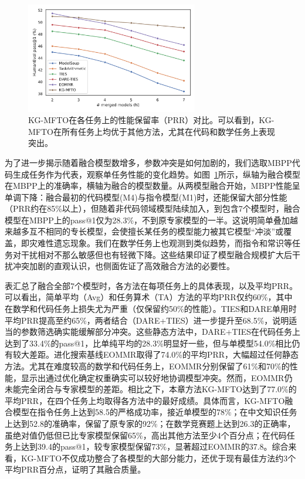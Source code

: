 \documentclass[../main.tex]{subfiles}
\begin{document}
\begin{figure}
	\centering
	\includegraphics[width=0.67\textwidth]{KG-MFTO/figure2_single_task_coding.pdf}
	\caption{KG-MFTO在各任务上的性能保留率（PRR）对比。可以看到，KG-MFTO在所有任务上均优于其他方法，尤其在代码和数学任务上表现突出。}
	\label{fig:task-wise-prr}
\end{figure}

为了进一步揭示随着融合模型数增多，参数冲突是如何加剧的，我们选取MBPP代码生成任务作为代表，观察单任务性能的变化趋势。如图~\ref{fig:task-wise-prr}所示，纵轴为融合模型在MBPP上的准确率，横轴为融合的模型数量。从两模型融合开始，MBPP性能呈单调下降：融合最初的代码模型(M4)与指令模型(M1)时，还能保留大部分性能（PRR约在85\%以上），但随着非代码领域模型陆续加入，到包含7个模型时，融合模型在MBPP上的pass@1仅为28.3\%，不到原专家模型的一半。这说明简单叠加越来越多互不相同的专长模型，会使擅长某任务的模型能力被其它模型“冲淡”或覆盖，即灾难性遗忘现象。我们在数学任务上也观测到类似趋势，而指令和常识等任务对干扰相对不那么敏感但也有轻微下降。这些结果印证了模型融合规模扩大后干扰冲突加剧的直观认识，也侧面佐证了高效融合方法的必要性。

表汇总了融合全部7个模型时，各方法在每项任务上的具体表现，以及平均PRR。可以看出，简单平均（Avg）和任务算术（TA）方法的平均PRR仅约60\%，其中在数学和代码任务上损失尤为严重（仅保留约50\%的性能）。TIES和DARE单用时平均PRR提高至约65\%，两者结合（DARE+TIES）进一步提升至68.5\%，说明适当的参数筛选确实能缓解部分冲突。这些静态方法中，DARE+TIES在代码任务上达到了33.4\%的pass@1，比单纯平均的28.3\%明显好一些，但与单模型54.0\%相比仍有较大差距。进化搜索基线EOMMR取得了74.0\%的平均PRR，大幅超过任何静态方法。尤其在难度较高的数学和代码任务上，EOMMR分别保留了61\%和70\%的性能，显示出通过优化确定权重确实可以较好地协调模型冲突。然而，EOMMR仍未能完全闭合与专家模型的差距。相比之下，本章方法KG-MFTO达到了77.0\%的平均PRR，在四个任务上均取得各方法中的最好成绩。具体而言，KG-MFTO融合模型在指令任务上达到58.5的严格成功率，接近单模型的78\%；在中文知识任务上达到52.8的准确率，保留了原专家的92\%；在数学竞赛题上达到26.3的正确率，虽绝对值仍低但已比专家模型保留65\%，高出其他方法至少4个百分点；在代码任务上达到39.4的pass@1，较专家模型保留73\%，显著超过EOMMR的37.8。综合来看，KG-MFTO不仅成功整合了各模型的大部分能力，还优于现有最佳方法约3个平均PRR百分点，证明了其融合质量。
\end{document}
